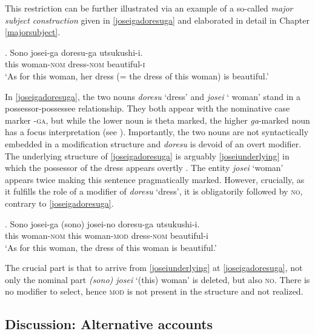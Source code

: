 \documentclass [output=book,colorlinks,citecolor=brown]{langscibook}
\begin{document}
This restriction can be further illustrated via an example of a so-called \textit{major subject construction} \citep{kuroda:1992:japanese, heycock:1993:focus, vermeulen:2005:poss} given in \ref{joseigadoresuga} and elaborated in detail in Chapter \ref{majorsubject}. %

\newpage

\exg. Sono josei-ga doresu-ga utsukushi-i.\\
this woman-\textsc{nom} dress-\textsc{nom} beautiful-\textsc{i}\\
`As for this woman, her dress (= the dress of this woman) is beautiful.’ \label{joseigadoresuga}

In \ref{joseigadoresuga}, the two nouns \textit{doresu} `dress’ and \textit{josei} ` woman’ stand in a possessor-possessee relationship. They both appear with the nominative case marker -\textsc{ga}, but while the lower noun is theta marked, the higher \textit{ga}-marked noun has a focus interpretation (see \citealt{heycock:1993:focus, vermeulen:2005:poss}). Importantly, the two nouns are not syntactically embedded in a modification structure and \textit{doresu} is devoid of an overt modifier. The underlying structure of \ref{joseigadoresuga} is arguably \ref{joseiunderlying} in which the possessor of the dress appears overtly \citep{kuroda:1992:japanese}. The entity \textit{josei} `woman’ appears twice making this sentence pragmatically marked. However, crucially, as it fulfills the role of a modifier of \textit{doresu} `dress’, it is obligatorily followed by \textsc{no}, contrary to \ref{joseigadoresuga}.

\exg. Sono josei-ga (sono) josei-no doresu-ga utsukushi-i.\\
this woman-\textsc{nom} this woman-\textsc{mod} dress-\textsc{nom} beautiful-i\\
`As for this woman, the dress of this woman is beautiful.’ \label{joseiunderlying}

The crucial part is that to arrive from \ref{joseiunderlying} at \ref{joseigadoresuga}, not only the nominal part \textit{(sono) josei} `(this) woman’ is deleted, but also \textsc{no}. There is no modifier to select, hence \textsc{mod} is not present in the structure and not realized.

\subsection{Discussion: Alternative accounts} \label{comparisonpreviousno}
\end{document}
